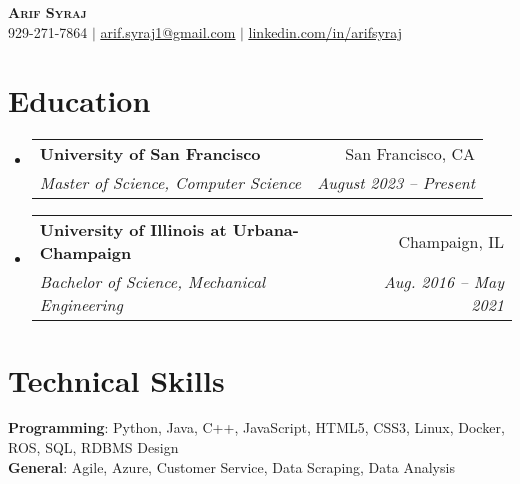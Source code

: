 \documentclass[letterpaper,11pt]{article}
\makeatletter
\newcommand{\resumeSubheading}[4]{
  \vspace{-2pt}\item
    \begin{tabular*}{0.97\textwidth}[t]{l@{\extracolsep{\fill}}r}
      \textbf{#1} & #2 \\
      \textit{\small#3} & \textit{\small #4} \\
    \end{tabular*}\vspace{-7pt}
}
\newcommand{\resumeSubHeadingListStart}
{\begin{itemize}[leftmargin=0.15in, label={}]}
\newcommand{\resumeSubHeadingListEnd}{\end{itemize}}
\makeatother
\begin{document}

\begin{center}
  \textbf{\Huge \scshape Arif Syraj} \\ \vspace{1pt}
  \small 929-271-7864 $|$ \href{mailto:x@x.com}{\underline{arif.syraj1@gmail.com}} $|$
  \href{https://linkedin.com/in/...}{\underline{linkedin.com/in/arifsyraj}} %
\end{center}


\section{Education}
\resumeSubHeadingListStart
\resumeSubheading
{University of San Francisco}{San Francisco, CA}
{Master of Science, Computer Science}{August 2023 -- Present}
\resumeSubheading
{University of Illinois at Urbana-Champaign}{Champaign, IL}
{Bachelor of Science, Mechanical Engineering}{Aug. 2016 -- May 2021}

\resumeSubHeadingListEnd


%
\section{Technical Skills}
\begin{itemize}[leftmargin=0.15in, label={}]
  \small{\item{
        \textbf{Programming}{: Python, Java, C++, JavaScript, HTML5, CSS3, Linux, Docker, ROS, SQL, RDBMS Design} \\
        \textbf{General}{: Agile, Azure, Customer Service, Data Scraping, Data Analysis}
        }}
\end{itemize}
\end{document}
